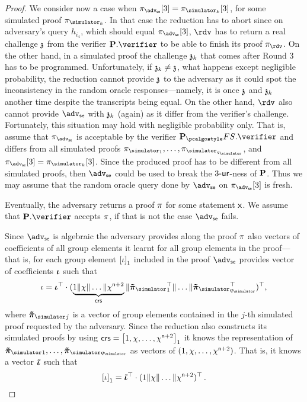 \documentclass[runningheads,11pt]{llncs}
\let\spvec\vec
\let\vec\accentvec
\let\vec\spvec
\def\vec#1{\mathchoice{\mbox{\boldmath$\displaystyle#1$}}
	{\mbox{\boldmath$\textstyle#1$}}
	{\mbox{\boldmath$\scriptstyle#1$}}
	{\mbox{\boldmath$\scriptscriptstyle#1$}}}
\theoremstyle{definition}
\begin{document}
\begin{proof}
	We consider now a case when $\zkproof_{\advse}[3] =\zkproof_{\simulator_k}[3]$, for some simulated proof $\zkproof_{\simulator_k}$.
	In that case the reduction has to abort since 
	on adversary's query $h_{i_4}$, which should equal $\zkproof_{\advse}[3]$, $\rdv$ has to return a real challenge $\mathfrak{z}$ from the verifier $\plonkprot.\verifier$ to be able to finish its proof $\zkproof_\rdv$. 
	On the other hand, in a simulated proof the challenge $\mathfrak{z}_k$ that comes after Round 3 has to be programmed. 
	Unfortunately, if $\mathfrak{z}_k \neq \mathfrak{z}$, what happens except negligible probability, the reduction cannot provide $\mathfrak{z}$ to the adversary as it could spot the inconsistency in the random oracle responses---namely, it is once $\mathfrak{z}$ and $\mathfrak{z}_k$ another time despite the transcripts being equal. On the other hand, $\rdv$ also cannot provide $\advse$ with $\mathfrak{z}_k$ (again) as it differ from the verifier's challenge.
	Fortunately, this situation may hold with negligible probability only. 
	That is, assume that $\zkproof_{\advse}$ is acceptable by the verifier $\plonkprotfs.\verifier$ and differs from all simulated proofs $\zkproof_{\simulator_1}, \ldots, \zkproof_{\simulator_{q_\simulator}}$, 
	and $\zkproof_{\advse}[3] =\zkproof_{\simulator_k}[3]$. 
	Since the produced proof has to be different from all simulated proofs, then $\advse$ could be used to break the ${3\text{-}\mathsf{ur}}$-ness of $\mathbf{P}$.
	Thus we may assume that the random oracle query done by $\advse$ on $\zkproof_{\advse}[3]$ is fresh.

	Eventually, the adversary returns a proof $\pi$ for some statement $\mathsf{x}$. We assume that $\plonkprot.\verifier$ accepts $\pi$, if that is not the case $\advse$ fails.
	
	Since $\advse$ is algebraic the adversary provides along the proof $\pi$ also vectors of coefficients of all group elements it learnt for all group elements in the proof---that is, for each group element $\left[\iota\right]_{1}$ included in the proof $\advse$ provides vector of coefficients $\vec{\iota}$ such that
	\[
		\iota = \vec{\iota}^\top \cdot (\underbrace{1 \| \chi \| \ldots \| \chi^{\numberofconstrains + 2}}_{\crs} \| \vec{\tilde{\zkproof}_\simulator}_1^{\top} \| \ldots \| \vec{\tilde{\zkproof}_\simulator}_{q_\simulator}^\top)^\top,
	\]
	where $\vec{\tilde{\zkproof}_\simulator}_{j}$ is a vector of group elements contained in the $j$-th simulated proof requested by the adversary.
	Since the reduction also constructs its simulated proofs by using $\mathsf{crs} = \left[1, \chi, \ldots, \chi^{\mathsf{n} + 2}\right]_{1}$ it knows the representation of $\vec{\tilde{\zkproof}_\simulator}_1, \ldots, \vec{\tilde{\zkproof}_\simulator}_{q_\simulator}$ as vectors of $(1, \chi, \ldots, \chi^{\mathsf{n} + 2})$. 
	That is, it knows a vector $\vec{\tilde{\iota}}$ such that
	\[
		\gone{\iota} = \vec{\tilde{\iota}}^\top \cdot (1 \| \chi \| \ldots \| \chi^{\numberofconstrains + 2})^\top\,.
	\]
	

\end{proof}
\end{document}
